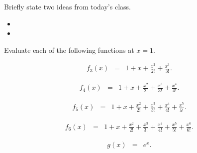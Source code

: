 \postClass

\begin{problem}
\item Briefly state two ideas from today's class.
  \begin{itemize}
  \item
  \item
  \end{itemize}
\item
  \begin{subproblem}
    \item
  \end{subproblem}
\end{problem}



\begin{problem}
\item Evaluate each of the following functions at $x=1$.
  \begin{subproblem}
  \item
    \begin{eqnarray*}
      f_3(x) & = & 1 + x + \frac{x^2}{2!} + \frac{x^3}{3!}.
    \end{eqnarray*}
    \vfill
  \item
    \begin{eqnarray*}
      f_4(x) & = & 1 + x + \frac{x^2}{2!} + \frac{x^3}{3!} + \frac{x^4}{4!}.
    \end{eqnarray*}
    \vfill
  \item
    \begin{eqnarray*}
      f_5(x) & = & 1 + x + \frac{x^2}{2!} + \frac{x^3}{3!} +
                   \frac{x^4}{4!} + \frac{x^5}{5!}.
    \end{eqnarray*}
    \vfill
  \item
    \begin{eqnarray*}
      f_6(x) & = & 1 + x + \frac{x^2}{2!} + \frac{x^3}{3!} +
                   \frac{x^4}{4!} + \frac{x^5}{5!} + \frac{x^6}{6!}.
    \end{eqnarray*}
    \vfill
  \item
    \begin{eqnarray*}
      g(x) & = & e^x.
    \end{eqnarray*}
    \vfill
  \end{subproblem}
\end{problem}


